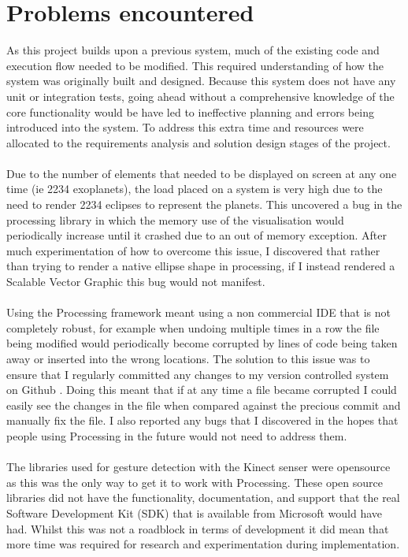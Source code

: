 \section{Problems encountered}

As this project builds upon a previous system, much of the existing code and
execution flow needed to be modified. This required understanding of how the
system was originally built and designed. Because this system does not have any
unit or integration tests, going ahead without a comprehensive knowledge of the
core functionality would be have led to ineffective planning and errors being
introduced into the system. To address this extra time and resources were
allocated to the requirements analysis and solution design stages of the
project.
\\\\
Due to the number of elements that needed to be displayed on screen at any one
time (ie 2234 exoplanets), the load placed on a system is very high due to the
need to render 2234 eclipses to represent the planets. This uncovered a bug in
the processing library in which the memory use of the visualisation would
periodically increase until it crashed due to an out of memory exception. After
much experimentation of how to overcome this issue, I discovered that rather
than trying to render a native ellipse shape in processing, if I instead
rendered
a Scalable Vector Graphic this bug would not manifest. 
\\\\
Using the Processing framework meant using a non commercial IDE that is not
completely robust, for example when undoing multiple times in a row the file
being
modified would periodically become corrupted by lines of code being taken away
or inserted into the wrong locations. The solution to this issue was to ensure
that I regularly committed any changes to my version controlled system on Github
\cite{github}. Doing this meant that if at any time a file became corrupted I
could easily see the changes in the file when compared against the precious
commit and manually fix the file. I also reported any bugs that I discovered in
the hopes that people using Processing in the future would not need to address
them.
\\\\
The libraries used for gesture detection with the Kinect senser were opensource
as this was the only way to get it to work with Processing. These open source
libraries did not have the functionality, documentation, and support that the
real Software Development Kit (SDK) that is available from Microsoft would have
had. Whilst this was not a roadblock in terms of development it did mean that
more time was required for research and experimentation during implementation.
\\\\

